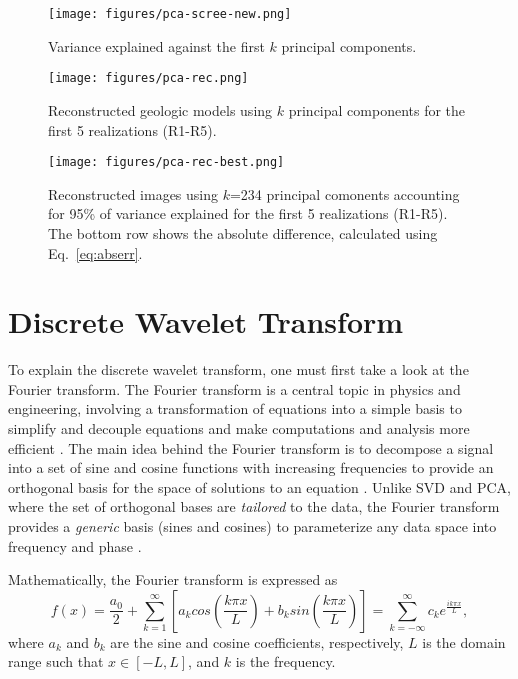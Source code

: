 \documentclass[a4paper,fleqn,12pt]{article}
\begin{document}
\begin{figure}[H]
    \centering
    \texttt{[image: figures/pca-scree-new.png]}
    \caption{Variance explained against the first $k$ principal components.}
    \label{fig:pca-scree}
\end{figure}

\begin{figure}[H]
    \centering
    \texttt{[image: figures/pca-rec.png]}
    \caption{Reconstructed geologic models using $k$ principal components for the first 5 realizations (R1-R5).}
    \label{fig:pca-rec}
\end{figure}

\begin{figure}[H]
    \centering
    \texttt{[image: figures/pca-rec-best.png]}
    \caption{Reconstructed images using $k$=234 principal comonents accounting for 95\% of variance explained for the first 5 realizations (R1-R5). The bottom row shows the absolute difference, calculated using Eq.~\ref{eq:abserr}.}
    \label{fig:pca-rec-best}
\end{figure}

\pagebreak
\section*{Discrete Wavelet Transform}

To explain the discrete wavelet transform, one must first take a look at the Fourier transform. The Fourier transform is a central topic in physics and engineering, involving a transformation of equations into a simple basis to simplify and decouple equations and make computations and analysis more efficient \cite{duhamel1990fast, li2020fourier}. The main idea behind the Fourier transform is to decompose a signal into a set of sine and cosine functions with increasing frequencies to provide an orthogonal basis for the space of solutions to an equation \cite{iorio2001fourier}. Unlike SVD and PCA, where the set of orthogonal bases are \emph{tailored} to the data, the Fourier transform provides a \emph{generic} basis (sines and cosines) to parameterize any data space into frequency and phase \cite{brunton2022data}.

Mathematically, the Fourier transform is expressed as
\begin{equation}
    f(x) = \frac{a_0}{2} + 
    \sum_{k=1}^\infty [a_k cos(\frac{k\pi x}{L}) + b_k sin(\frac{k\pi x}{L})] 
    = \sum_{k=-\infty}^{\infty} c_k e^{\frac{ik\pi x}{L}} ,
\end{equation}
where $a_k$ and $b_k$ are the sine and cosine coefficients, respectively, $L$ is the domain range such that $x\in[-L,L]$, and $k$ is the frequency.
\end{document}
